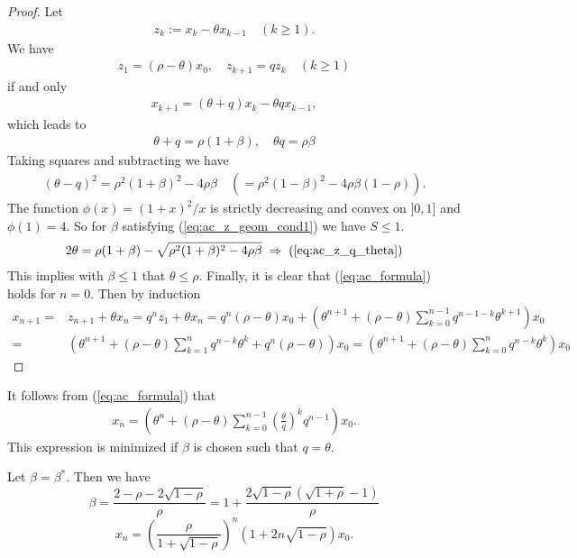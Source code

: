 \documentclass[english,12pt,a4paper]{article}
\begin{document}
\begin{proof}
Let 
%
\begin{align*}
z_k := x_k - \theta x_{k-1}\quad (k\ge1).
\end{align*}
%
We have 
\begin{align*}
z_1 = (\rho-\theta)x_0,\quad z_{k+1} = q z_k\quad (k\ge1)
\end{align*}
%
if and only 
%
\begin{align*}
x_{k+1} = (\theta + q) x_k - \theta q x_{k-1},
\end{align*}
%
which leads to
%
\begin{align*}
\theta + q = \rho(1+\beta), \quad \theta q = \rho\beta
\end{align*}
%
Taking squares and subtracting we have
%
\begin{align*}
(\theta - q)^2 = \rho^2(1+\beta)^2 - 4 \rho\beta \quad \left( = \rho^2(1-\beta)^2 - 4 \rho\beta(1-\rho)\right).
\end{align*}
%
The function $\phi(x)=(1+x)^2/x$ is strictly decreasing and convex on $]0,1]$ and $\phi(1)=4$. So for $\beta$ satisfying (\ref{eq:ac_z_geom_cond1}) we  have 
$S\le 1$.
%
\begin{align*}
2\theta = \rho(1+\beta) - \sqrt{\rho^2(1+\beta)^2 - 4 \rho\beta} \;\Rightarrow\; (\ref{eq:ac_z_q_theta})
\end{align*}
%
This implies with $\beta\le 1$ that $\theta\le \rho$. 
%
Finally, it is clear that (\ref{eq:ac_formula}) holds for $n=0$. Then by induction
%
\begin{align*}
x_{n+1} =& z_{n+1}+\theta x_n = q^{n} z_1 +\theta x_n= q^{n} (\rho-\theta)x_0 + \left(\theta^{n+1} + (\rho-\theta)\sum_{k=0}^{n-1} q^{n-1-k}\theta^{k+1}\right)x_0\\
=& \left(\theta^{n+1} + (\rho-\theta)\sum_{k=1}^{n} q^{n-k}\theta^{k}+ q^{n} (\rho-\theta)\right)x_0
= \left(\theta^{n+1} + (\rho-\theta)\sum_{k=0}^{n} q^{n-k}\theta^{k}\right)x_0
\end{align*}
%
\end{proof}
%
It follows from (\ref{eq:ac_formula}) that
%
\begin{align*}
x_{n} = \left( \theta^n + (\rho-\theta)\sum_{k=0}^{n-1} \left(\frac{\theta}{q}\right)^k q^{n-1}\right)x_0.
\end{align*}
%
This expression is minimized if $\beta$ is chosen such that $q=\theta$.
\begin{theorem}\label{thm:}
Let $\beta=\beta^*$. Then we have
%
%
\begin{equation}\label{eq:ac_betaopt}
\beta = \frac{2-\rho - 2\sqrt{1-\rho}}{\rho} = 1 + \frac{2\sqrt{1-\rho}\left(\sqrt{1+\rho}-1\right)}{\rho}
\end{equation}
%
%
\begin{equation}\label{eq:ac_betaot_conv}
x_{n} = \left( \frac{\rho}{1+\sqrt{1-\rho}} \right)^n\left( 1 + 2n \sqrt{1-\rho}\right)x_0.
\end{equation}
\end{theorem}
\end{document}
